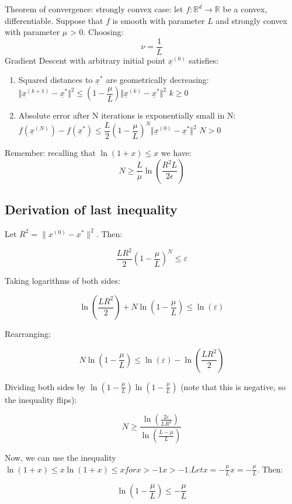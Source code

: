 Theorem of convergence: strongly convex case: let $f: \mathbb{R}^d \to \mathbb{R}$ be a convex, differentiable. Suppose that $f$ is smooth with parameter $L$ and strongly convex with parameter $\mu$ > 0. Choosing:
\[
    \nu = \dfrac{1}{L}    
\]
Gradient Descent with arbitrary initial point $\underline{x}^{(0)}$ satisfies:
\begin{enumerate}
    \item Squared distances to $\underline{x}^*$ are geometrically decreasing: $\Vert \underline{x}^{(k+1)} - \underline{x}^* \Vert^2 \leq \left(1-\dfrac{\mu}{L}\right)\Vert \underline{x}^{(k)} - \underline{x}^* \Vert^2$ \hspace{1cm} $k \geq 0$
    \item Absolute error after N iterations is exponentially small in N: $f(\underline{x}^{(N)}) - f(\underline{x}^*) \leq \dfrac{L}{2}\left(1-\dfrac{\mu}{L}\right)^N \Vert \underline{x}^{(0)} - \underline{x}^* \Vert^2$ \hspace{1cm} $N > 0$
\end{enumerate}
Remember: recalling that $\ln(1+x)\leq x$ we have:
\[
    N \geq \dfrac{L}{\mu} \ln\left(\dfrac{R^2 L}{2\epsilon}\right)    
\]

\subsection*{Derivation of last inequality}

Let $R^2 = \|x^{(0)} - x^*\|^2$. Then:

\[
\frac{LR^2}{2}\left(1 - \frac{\mu}{L}\right)^N \leq \varepsilon
\]

Taking logarithms of both sides:

\[
\ln\left(\frac{LR^2}{2}\right) + N\ln\left(1 - \frac{\mu}{L}\right) \leq \ln(\varepsilon)
\]

Rearranging:

\[
N\ln\left(1 - \frac{\mu}{L}\right) \leq \ln(\varepsilon) - \ln\left(\frac{LR^2}{2}\right)
\]

Dividing both sides by $\ln\left(1 - \frac{\mu}{L}\right)\ln\left(1 - \frac{\mu}{L}\right)$ (note that this is negative, so the inequality flips):

\[
N \geq \frac{\ln\left(\frac{2\varepsilon}{LR^2}\right)}{\ln\left(\frac{L-\mu}{L}\right)}
\]

Now, we can use the inequality $\ln(1+x) \leq x\ln(1+x) \leq x for x > -1x > -1. Let x = -\frac{\mu}{L}x = -\frac{\mu}{L}.$ Then:

\[
\ln\left(1 - \frac{\mu}{L}\right) \leq -\frac{\mu}{L}
\]

